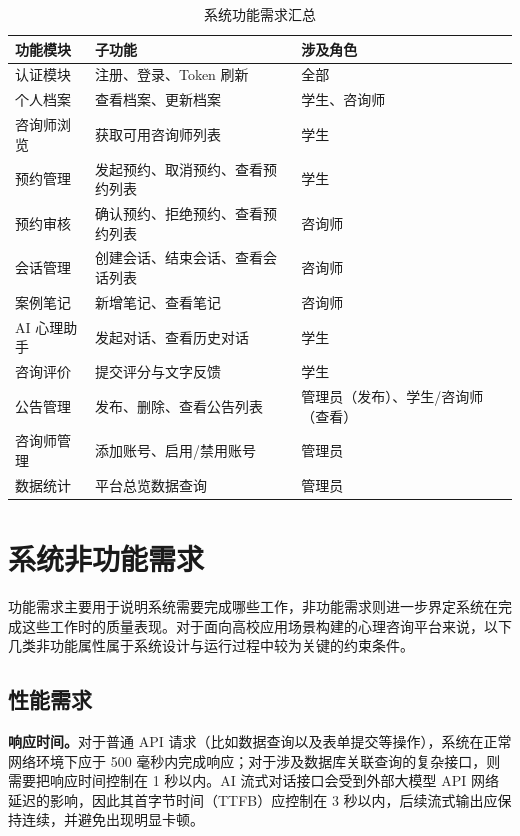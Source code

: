 \begin{table}[H]
    \centering
    \caption{系统功能需求汇总}
    \label{tab:2-1}
    \begin{tabularx}{\linewidth}{lXl}
        \toprule
        功能模块 & 子功能 & 涉及角色 \\
        \midrule
        认证模块 & 注册、登录、Token 刷新 & 全部 \\
        个人档案 & 查看档案、更新档案 & 学生、咨询师 \\
        咨询师浏览 & 获取可用咨询师列表 & 学生 \\
        预约管理 & 发起预约、取消预约、查看预约列表 & 学生 \\
        预约审核 & 确认预约、拒绝预约、查看预约列表 & 咨询师 \\
        会话管理 & 创建会话、结束会话、查看会话列表 & 咨询师 \\
        案例笔记 & 新增笔记、查看笔记 & 咨询师 \\
        AI 心理助手 & 发起对话、查看历史对话 & 学生 \\
        咨询评价 & 提交评分与文字反馈 & 学生 \\
        公告管理 & 发布、删除、查看公告列表 & 管理员（发布）、学生/咨询师（查看） \\
        咨询师管理 & 添加账号、启用/禁用账号 & 管理员 \\
        数据统计 & 平台总览数据查询 & 管理员 \\
        \bottomrule
    \end{tabularx}
\end{table}


\section{系统非功能需求}

功能需求主要用于说明系统需要完成哪些工作，非功能需求则进一步界定系统在完成这些工作时的质量表现。对于面向高校应用场景构建的心理咨询平台来说，以下几类非功能属性属于系统设计与运行过程中较为关键的约束条件。

\subsection{性能需求}

\textbf{响应时间。}对于普通 API 请求（比如数据查询以及表单提交等操作），系统在正常网络环境下应于 500 毫秒内完成响应；对于涉及数据库关联查询的复杂接口，则需要把响应时间控制在 1 秒以内。AI 流式对话接口会受到外部大模型 API 网络延迟的影响，因此其首字节时间（TTFB）应控制在 3 秒以内，后续流式输出应保持连续，并避免出现明显卡顿。

